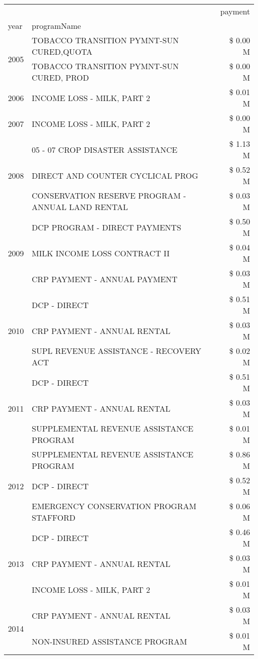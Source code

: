 \begin{tabular}{llr}
\toprule
 &  & payment \\
year & programName &  \\
\midrule
\multirow[t]{2}{*}{2005} & TOBACCO TRANSITION PYMNT-SUN CURED,QUOTA & \$ 0.00 M \\
 & TOBACCO TRANSITION PYMNT-SUN CURED, PROD & \$ 0.00 M \\
\cline{1-3}
2006 & INCOME LOSS - MILK, PART 2 & \$ 0.01 M \\
\cline{1-3}
2007 & INCOME LOSS - MILK, PART 2 & \$ 0.00 M \\
\cline{1-3}
\multirow[t]{3}{*}{2008} & 05 - 07 CROP DISASTER ASSISTANCE & \$ 1.13 M \\
 & DIRECT AND COUNTER CYCLICAL PROG & \$ 0.52 M \\
 & CONSERVATION RESERVE PROGRAM - ANNUAL LAND RENTAL & \$ 0.03 M \\
\cline{1-3}
\multirow[t]{3}{*}{2009} & DCP PROGRAM - DIRECT PAYMENTS & \$ 0.50 M \\
 & MILK INCOME LOSS CONTRACT II & \$ 0.04 M \\
 & CRP PAYMENT - ANNUAL PAYMENT & \$ 0.03 M \\
\cline{1-3}
\multirow[t]{3}{*}{2010} & DCP - DIRECT & \$ 0.51 M \\
 & CRP PAYMENT - ANNUAL RENTAL & \$ 0.03 M \\
 & SUPL REVENUE ASSISTANCE - RECOVERY ACT & \$ 0.02 M \\
\cline{1-3}
\multirow[t]{3}{*}{2011} & DCP - DIRECT & \$ 0.51 M \\
 & CRP PAYMENT - ANNUAL RENTAL & \$ 0.03 M \\
 & SUPPLEMENTAL REVENUE ASSISTANCE PROGRAM & \$ 0.01 M \\
\cline{1-3}
\multirow[t]{3}{*}{2012} & SUPPLEMENTAL REVENUE ASSISTANCE PROGRAM & \$ 0.86 M \\
 & DCP - DIRECT & \$ 0.52 M \\
 & EMERGENCY CONSERVATION PROGRAM STAFFORD & \$ 0.06 M \\
\cline{1-3}
\multirow[t]{3}{*}{2013} & DCP - DIRECT & \$ 0.46 M \\
 & CRP PAYMENT - ANNUAL RENTAL & \$ 0.03 M \\
 & INCOME LOSS - MILK, PART 2 & \$ 0.01 M \\
\cline{1-3}
\multirow[t]{2}{*}{2014} & CRP PAYMENT - ANNUAL RENTAL & \$ 0.03 M \\
 & NON-INSURED ASSISTANCE PROGRAM & \$ 0.01 M \\

\end{tabular}
